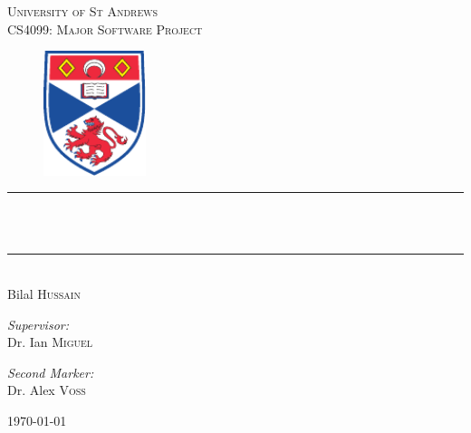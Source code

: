 
\begin{titlepage}
\thispagestyle{empty}
\begin{center}


\textsc{\LARGE University of St Andrews}\\[10pt]
\textsc{\large CS4099: Major Software Project}\\[1cm]

\begin{figure}[htbp]
	\centering
		\includegraphics[width=3cm]{settings/logo.pdf}
	\label{fig:settings_logo}
\end{figure}


\newcommand{\HRule}{\rule{9cm}{0.5mm}}

\HRule\\[10pt]
{ \Huge \bfseries \theTitle }\\
\HRule\\[20pt]
{\LARGE Bilal \textsc{Hussain}}
\vspace{1.5cm}

\begin{minipage}{0.4\textwidth}
\begin{flushleft} \large
\emph{Supervisor:} \\
Dr. Ian  \textsc{Miguel}
\end{flushleft}
\end{minipage}
\begin{minipage}{0.4\textwidth}
\begin{flushright} \large
\emph{Second Marker:} \\
Dr. Alex \textsc{Voss}
\end{flushright}
\end{minipage}

\vfill

{\large \today}
\end{center}
\end{titlepage}